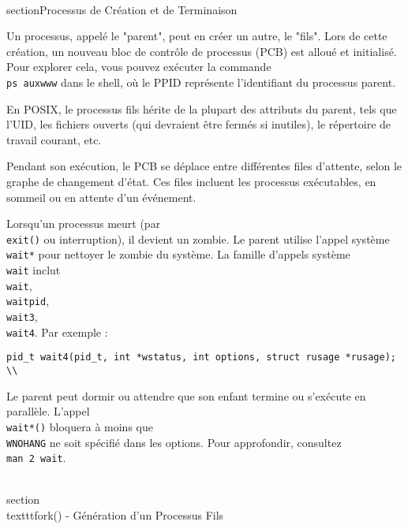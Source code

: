 \documentclass[12pt]{article}
\begin{document}
\maketitle
\tableofcontents
\newpage

\\section{Processus de Création et de Terminaison}

Un processus, appelé le "parent", peut en créer un autre, le "fils". Lors de cette création, un nouveau bloc de contrôle de processus (PCB) est alloué et initialisé. Pour explorer cela, vous pouvez exécuter la commande \\\texttt{ps auxwww} dans le shell, où le PPID représente l'identifiant du processus parent.

En POSIX, le processus fils hérite de la plupart des attributs du parent, tels que l'UID, les fichiers ouverts (qui devraient être fermés si inutiles), le répertoire de travail courant, etc.

Pendant son exécution, le PCB se déplace entre différentes files d'attente, selon le graphe de changement d'état. Ces files incluent les processus exécutables, en sommeil ou en attente d'un événement.

Lorsqu'un processus meurt (par \\\texttt{exit()} ou interruption), il devient un zombie. Le parent utilise l'appel système \\\texttt{wait*} pour nettoyer le zombie du système. La famille d'appels système \\\texttt{wait} inclut \\\texttt{wait}, \\\texttt{waitpid}, \\\texttt{wait3}, \\\texttt{wait4}. Par exemple :
\\\begin{lstlisting}
pid_t wait4(pid_t, int *wstatus, int options, struct rusage *rusage);
\\\end{lstlisting}

Le parent peut dormir ou attendre que son enfant termine ou s'exécute en parallèle. L'appel \\\texttt{wait*()} bloquera à moins que \\\texttt{WNOHANG} ne soit spécifié dans les options. Pour approfondir, consultez \\\texttt{man 2 wait}.

\\section{\\texttt{fork()} - Génération d'un Processus Fils}
\end{document}
